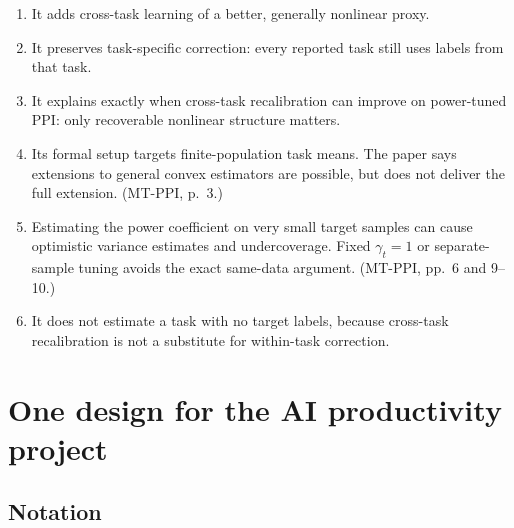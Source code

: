 \documentclass[11pt]{article}
\begin{document}
  \begin{enumerate}[leftmargin=2em]
      \item It adds cross-task learning of a better, generally nonlinear proxy.
      \item It preserves task-specific correction: every reported task still
      uses labels from that task.
      \item It explains exactly when cross-task recalibration can improve on
      power-tuned PPI: only recoverable nonlinear structure matters.
      \item Its formal setup targets finite-population task means. The paper
      says extensions to general convex estimators are possible, but does not
      deliver the full extension. (MT-PPI, p.~3.)
      \item Estimating the power coefficient on very small target samples can
      cause optimistic variance estimates and undercoverage. Fixed
      \(\gamma_t=1\) or separate-sample tuning avoids the exact same-data
      argument. (MT-PPI, pp.~6 and 9--10.)
      \item It does not estimate a task with no target labels, because
      cross-task recalibration is not a substitute for within-task correction.
  \end{enumerate}
  
  \section{One design for the AI productivity project}
  
  \subsection*{Notation}
  
\end{document}
